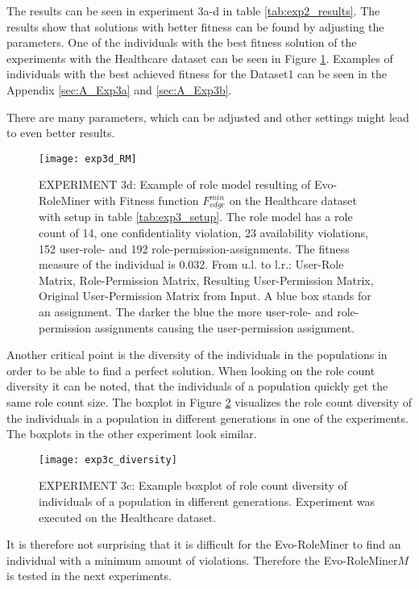 The results can be seen in experiment 3a-d in table \ref{tab:exp2_results}. The results show that solutions with better fitness can be found by adjusting the parameters. One of the individuals with the best fitness solution of the experiments with the Healthcare dataset can be seen in Figure \ref{fig:exp3d_RM}. Examples of individuals with the best achieved fitness for the Dataset1 can be seen in the Appendix \ref{sec:A_Exp3a} and \ref{sec:A_Exp3b}.

There are many parameters, which can be adjusted and other settings might lead to even better results.

\begin{figure}[H]
    \centering
    \texttt{[image: exp3d\_RM]}
    \caption{EXPERIMENT 3d: Example of role model resulting of Evo-RoleMiner with Fitness function $F_{edge}^{min}$ on the Healthcare dataset with setup in table \ref{tab:exp3_setup}. The role model has a role count of 14, one confidentiality violation, 23 availability violations, 152 user-role- and 192 role-permission-assignments. The fitness measure of the individual is 0.032. From u.l. to l.r.: User-Role Matrix, Role-Permission Matrix, Resulting User-Permission Matrix, Original User-Permission Matrix from Input. A blue box stands for an assignment. The darker the blue the more user-role- and role-permission assignments causing the user-permission assignment.}
    \label{fig:exp3d_RM}
\end{figure}

Another critical point is the diversity of the individuals in the populations in order to be able to find a perfect solution. When looking on the role count diversity it can be noted, that the individuals of a population quickly get the same role count size. The boxplot in Figure \ref{fig:exp3c_diversity} visualizes the role count diversity of the individuals in a population in different generations in one of the experiments. The boxplots in the other experiment look similar.

\begin{figure}[H]
	\centering
	\texttt{[image: exp3c\_diversity]}
	\caption{EXPERIMENT 3c: Example boxplot of role count diversity of individuals of a population in different generations. Experiment was executed on the Healthcare dataset.}
	\label{fig:exp3c_diversity}
\end{figure}

It is therefore not surprising that it is difficult for the Evo-RoleMiner to find an individual with a minimum amount of violations. Therefore the Evo-RoleMiner$M$ is tested in the next experiments.